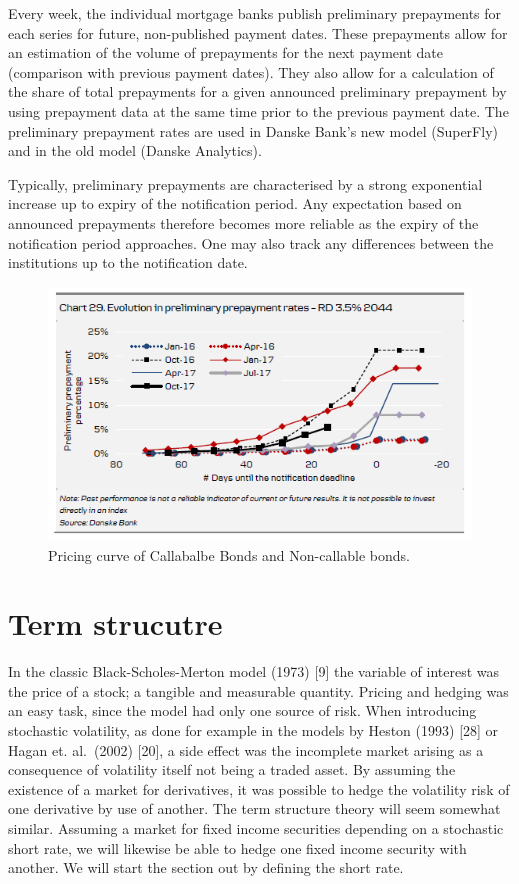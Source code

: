 \documentclass[12pt,twoside]{reedthesis}
\begin{document}
Every week, the individual mortgage banks publish preliminary prepayments for each
series for future, non-published payment dates. These prepayments allow for an estimation of the volume of prepayments for the next payment date (comparison with previous payment dates). They also allow for a calculation of the share of total prepayments for a given announced preliminary prepayment by using prepayment data at the same time prior to the previous payment date. The preliminary prepayment rates are used in Danske Bank's new model (SuperFly) and in the old model (Danske Analytics).

Typically, preliminary prepayments are characterised by a strong exponential increase up to expiry of the notification period. Any expectation based on announced prepayments therefore becomes more reliable as the expiry of the notification period approaches. One may also track any differences between the institutions up to the notification date.
\begin{figure}

{\centering \includegraphics[width=1\linewidth]{figure/evolution in prepayments} 

}

\caption{Pricing curve of Callabalbe Bonds and Non-callable bonds.}\label{fig:PrepaymentRates}
\end{figure}
\hypertarget{term-strucutre}{%
\chapter{Term strucutre}\label{term-strucutre}}

In the classic Black-Scholes-Merton model (1973) {[}9{]} the variable of interest was the price
of a stock; a tangible and measurable quantity. Pricing and hedging was an easy task,
since the model had only one source of risk. When introducing stochastic volatility, as
done for example in the models by Heston (1993) {[}28{]} or Hagan et. al.~(2002) {[}20{]}, a side
effect was the incomplete market arising as a consequence of volatility itself not being a
traded asset. By assuming the existence of a market for derivatives, it was possible to
hedge the volatility risk of one derivative by use of another. The term structure theory
will seem somewhat similar. Assuming a market for fixed income securities depending on
a stochastic short rate, we will likewise be able to hedge one fixed income security with
another. We will start the section out by defining the short rate.
\end{document}
